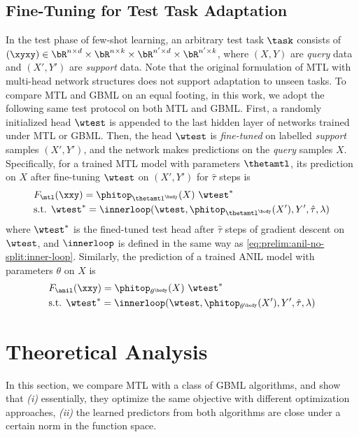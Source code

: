 \documentclass{article}
\begin{document}
\subsection{Fine-Tuning for Test Task Adaptation}\label{sec:prelim:fine-tune}
In the test phase of few-shot learning, an arbitrary test task $\task$ consists of
$(\xyxy) \in \bR^{n\times d}\times  \bR^{n\times k}\times \bR^{n'\times d}\times \bR^{n'\times k}$,
\label{eq:prelim:def-test-task}
where $(X,Y)$ are \textit{query} data and $(X',Y')$ are \textit{support} data. Note that the original formulation of MTL with multi-head network structures does not support adaptation to unseen tasks. To compare MTL and GBML on an equal footing, in this work, we adopt the following same test protocol on both MTL and GBML. First, a randomly initialized head $\wtest$ is appended to the last hidden layer of networks trained under MTL or GBML. Then, the head $\wtest$ is \textit{fine-tuned} on labelled \textit{support} samples $(X',Y')$, and the network makes predictions on the \textit{query} samples $X$.
Specifically, for a trained MTL model with parameters $\thetamtl$, its prediction on $X$ after fine-tuning $\wtest$ on $(X',Y')$ for $\hat\tau$ steps is
\begin{align}
    &F_\mtl(\xxy) = \phitop_{\thetamtl^\body}(X) ~\wtest^*\label{eq:fine-tune:mtl:1}\\
    &\text{s.t. }\wtest^* = \innerloop(\wtest, \phitop_{\thetamtl^\body}(X'),Y',\hat{\tau},\lambda)\label{eq:fine-tune:mtl:2}
\end{align}
where $\wtest^*$ is the fined-tuned test head after $\hat\tau$ steps of gradient descent on $\wtest$, and $\innerloop$ is defined in the same way as \eqref{eq:prelim:anil-no-split:inner-loop}. Similarly, the prediction of a trained ANIL model with parameters $\theta$ on $X$ is
\begin{align}
    &F_\anil(\xxy) = \phitop_{\theta^\body}(X) ~\wtest^*\label{eq:fine-tune:anil:1}\\
    &\text{s.t. }\wtest^* = \innerloop(\wtest, \phitop_{\theta^\body}(X'),Y',\hat{\tau},\lambda)\label{eq:fine-tune:anil:2}
\end{align}

\vspace{-1em}
\section{Theoretical Analysis}
\label{sec:theory}
In this section, we compare MTL with a class of GBML algorithms, and show that \textit{(i)} essentially, they optimize the same objective with different optimization approaches, \textit{(ii)} the learned predictors from both algorithms are close under a certain norm in the function space. 
\end{document}
